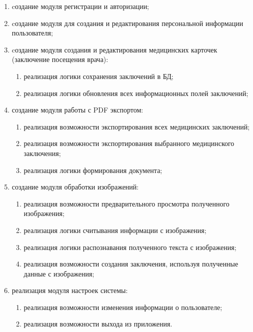 \begin{enumerate}
\item cоздание модуля регистрации и авторизации;
\item cоздание модуля для создания и редактирования персональной информации пользователя;
\item cоздание модуля создания и редактирования медицинских карточек (заключение посещения врача):
\begin{enumerate}
\item реализация логики сохранения заключений в БД;
\item реализация логики обновления всех информационных полей заключений;
\end{enumerate}
\item создание модуля работы с PDF экспортом:
\begin{enumerate}
\item реализация возможности экспортирования всех медицинских заключений;
\item реализация возможности экспортирования выбранного медицинского заключения;
\item реализация логики формирования документа;
\end{enumerate}
\item создание модуля обработки изображений:
\begin{enumerate}
\item реализация возможности предварительного просмотра полученного изображения;
\item реализация логики считывания информации с изображения;
\item реализация логики распознавания полученного текста с изображения;
\item реализация возможности создания заключения, используя полученные данные с изображения;
\end{enumerate}
\item реализация модуля настроек системы:
\begin{enumerate}
\item реализация возможности изменения информации о пользователе;
\item реализация возможности выхода из приложения.
\end{enumerate}
\end{enumerate}

